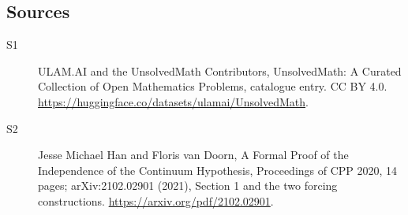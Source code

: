 \documentclass[11pt]{article}
\begin{document}
\subsection{Sources}
\begin{description}
\item[\hypertarget{source:statement:1}{S1}] ULAM.AI and the UnsolvedMath Contributors, UnsolvedMath: A Curated Collection of Open Mathematics Problems, catalogue entry. CC BY 4.0. \url{https://huggingface.co/datasets/ulamai/UnsolvedMath}.
\item[\hypertarget{source:statement:2}{S2}] Jesse Michael Han and Floris van Doorn, A Formal Proof of the Independence of the Continuum Hypothesis, Proceedings of CPP 2020, 14 pages; arXiv:2102.02901 (2021), Section 1 and the two forcing constructions. \url{https://arxiv.org/pdf/2102.02901}.
\end{description}
\label{end:statement}
\end{document}
